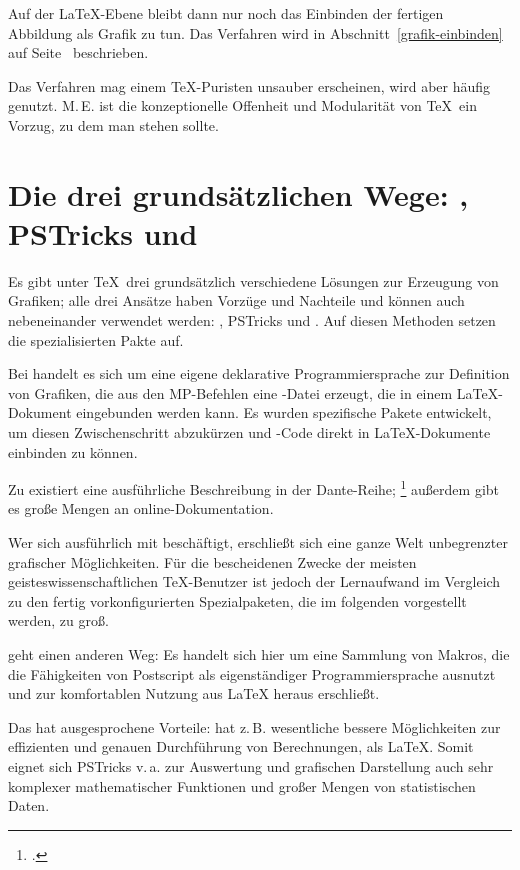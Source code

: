 Auf der \LaTeX-Ebene bleibt dann nur noch das Einbinden der fertigen Abbildung als Grafik zu
tun. Das Verfahren wird in Abschnitt~\ref{grafik-einbinden} auf Seite~\pageref{grafik-einbinden}
beschrieben.

Das Verfahren mag einem \TeX-Puristen unsauber erscheinen, wird aber häufig genutzt.
M.\,E. ist die konzeptionelle Offenheit und Modularität von \TeX\ ein Vorzug, zu dem man stehen sollte.


\section{Die drei grundsätzlichen Wege: \METAPOST, PSTricks und \TikZ}

Es gibt unter \TeX\ drei grundsätzlich verschiedene Lösungen zur Erzeugung von Grafiken;
alle drei Ansätze haben Vorzüge und Nachteile und können auch nebeneinander verwendet werden:
\METAPOST, PSTricks und \TikZ. Auf diesen Methoden setzen die spezialisierten Pakte auf.

Bei \METAPOST{} handelt es sich um eine eigene deklarative Programmiersprache zur Definition
von Grafiken, die aus den MP-Befehlen eine \PS-Datei erzeugt, die in einem \LaTeX-Dokument
eingebunden werden kann.
Es wurden spezifische Pakete entwickelt, um diesen Zwischenschritt abzukürzen und 
\METAPOST-Code direkt in \LaTeX -Dokumente einbinden zu können.

Zu \METAPOST{} existiert eine ausführliche Beschreibung in der Dante-Reihe;%
\footcite{entenmann:metapost}
außerdem gibt es große Mengen an online-Dokumentation.

Wer sich ausführlich mit \METAPOST{} beschäftigt, erschließt sich eine ganze Welt unbegrenzter
grafischer Möglichkeiten. Für die bescheidenen Zwecke der meisten geisteswissenschaftlichen
\TeX-Benutzer ist jedoch der Lernaufwand im Vergleich zu den fertig vorkonfigurierten Spezialpaketen,
die im folgenden vorgestellt werden, zu groß.


 geht einen anderen Weg: Es handelt sich hier um eine Sammlung von Makros, die die
Fähigkeiten von Postscript als eigenständiger Programmiersprache ausnutzt und zur komfortablen
Nutzung aus \LaTeX{} heraus erschließt.

Das hat ausgesprochene Vorteile: \PS{} hat z.\,B. wesentliche bessere Möglichkeiten zur
effizienten und genauen Durchführung von Berechnungen, als \LaTeX{}.
Somit eignet sich PSTricks v.\,a. zur Auswertung und grafischen Darstellung auch sehr komplexer
mathematischer Funktionen und großer Mengen von statistischen Daten. 

